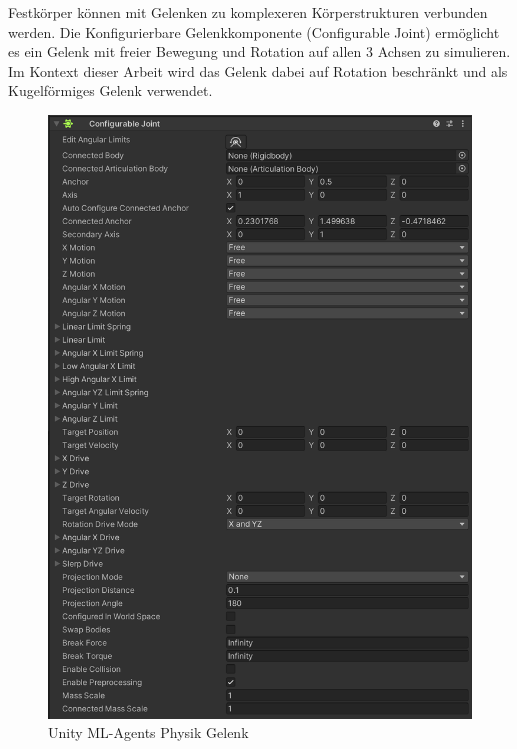 Festkörper können mit Gelenken zu komplexeren Körperstrukturen verbunden werden. Die Konfigurierbare Gelenkkomponente (Configurable Joint) ermöglicht es ein Gelenk mit freier Bewegung und Rotation auf allen 3 Achsen zu simulieren. Im Kontext dieser Arbeit wird das Gelenk dabei auf Rotation beschränkt und als Kugelförmiges Gelenk verwendet.
\begin{figure}[H]
  \centering
  \includegraphics[scale=0.5]{img/physik_gelenk.png}
  \caption{Unity ML-Agents Physik Gelenk}
  \label{fig:physik_gelenk}
\end{figure}
